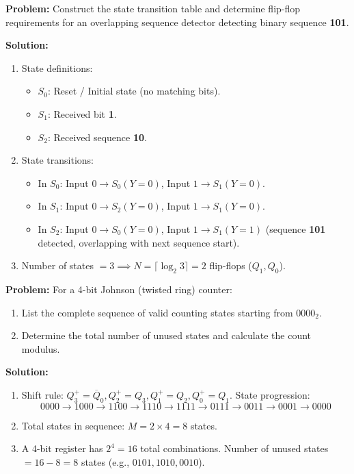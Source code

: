 \begin{examplebox}
\textbf{Problem:} Construct the state transition table and determine flip-flop requirements for an overlapping sequence detector detecting binary sequence \textbf{101}.

\textbf{Solution:}
\begin{enumerate}
    \item State definitions:
    \begin{itemize}
        \item $S_0$: Reset / Initial state (no matching bits).
        \item $S_1$: Received bit \textbf{1}.
        \item $S_2$: Received sequence \textbf{10}.
    \end{itemize}
    \item State transitions:
    \begin{itemize}
        \item In $S_0$: Input $0 \to S_0 (Y=0)$, Input $1 \to S_1 (Y=0)$.
        \item In $S_1$: Input $0 \to S_2 (Y=0)$, Input $1 \to S_1 (Y=0)$.
        \item In $S_2$: Input $0 \to S_0 (Y=0)$, Input $1 \to S_1 (Y=1)$ (sequence \textbf{101} detected, overlapping with next sequence start).
    \end{itemize}
    \item Number of states $= 3 \implies N = \lceil \log_2 3 \rceil = 2$ flip-flops ($Q_1, Q_0$).
\end{enumerate}
\end{examplebox}

\begin{examplebox}
\textbf{Problem:} For a 4-bit Johnson (twisted ring) counter:
\begin{enumerate}
    \item List the complete sequence of valid counting states starting from $0000_2$.
    \item Determine the total number of unused states and calculate the count modulus.
\end{enumerate}

\textbf{Solution:}
\begin{enumerate}
    \item Shift rule: $Q_3^+ = \overline{Q}_0, Q_2^+ = Q_3, Q_1^+ = Q_2, Q_0^+ = Q_1$.
    State progression:
    \begin{equation}
    0000 \to 1000 \to 1100 \to 1110 \to 1111 \to 0111 \to 0011 \to 0001 \to 0000
    \end{equation}
    \item Total states in sequence: $M = 2 \times 4 = 8$ states.
    \item A 4-bit register has $2^4 = 16$ total combinations.
    Number of unused states $= 16 - 8 = 8$ states (e.g., $0101, 1010, 0010$).
\end{enumerate}
\end{examplebox}

